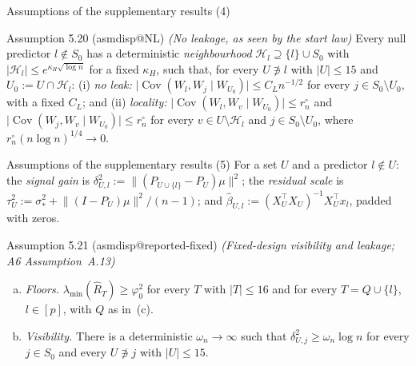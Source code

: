 \documentclass[aspectratio=169]{beamer}
\makeatletter
\newcommand{\asmdisp}[1]{\csname asmdisp@#1\endcsname}
\newcommand{\set}[1]{[#1]}
\newcommand{\abs}[1]{\lvert #1\rvert}
\newcommand{\norm}[1]{\lVert #1\rVert}
\DeclareMathOperator{\Cov}{Cov}
\newcommand{\lmin}{\lambda_{\min}}
\newcommand{\sigs}{\sigma_*}
\newcommand{\Sz}{S_0}
\newcommand{\Rhat}{\hat R}
\newcommand{\Hl}{\mathcal H}
\makeatother
\begin{document}
\begin{frame}{Assumptions of the supplementary results (4)}
\small
\begin{block}{Assumption 5.20 (\asmdisp{NL}) \textit{(No leakage, as seen by the start law)}}
Every null predictor $l\notin\Sz$ has a deterministic \emph{neighbourhood} $\Hl_l\supseteq\{l\}\cup\Sz$ with
$\abs{\Hl_l}\le e^{\kappa_H\sqrt{\log n}}$ for a fixed $\kappa_H$, such that, for every $U\not\ni l$ with $\abs{U}\le15$ and
$U_0:=U\cap\Hl_l$: (i) \emph{no leak:} $\abs{\Cov(W_l,W_j\mid W_{U_0})}\le C_Ln^{-1/2}$ for every $j\in\Sz\setminus U_0$,
with a fixed $C_L$; and (ii) \emph{locality:} $\abs{\Cov(W_l,W_v\mid W_{U_0})}\le r^\circ_n$ and
$\abs{\Cov(W_j,W_v\mid W_{U_0})}\le r^\circ_n$ for every $v\in U\setminus\Hl_l$ and $j\in\Sz\setminus U_0$, where
$r^\circ_n(n\log n)^{1/4}\to0$.
\end{block}
\end{frame}

\begin{frame}{Assumptions of the supplementary results (5)}
\small
\noindent For a set $U$ and a predictor $l\notin U$: the \emph{signal gain} is $\delta^2_{U,l}:=\norm{(P_{U\cup\{l\}}-P_U)\mu}^2$;
the \emph{residual scale} is $\tau^2_U:=\sigs^2+\norm{(I-P_U)\mu}^2/(n-1)$; and $\hat\beta_{U,l}:=(X_U^\top X_U)^{-1}X_U^\top
x_l$, padded with zeros.

\begin{block}{Assumption 5.21 (\asmdisp{reported-fixed}) \textit{(Fixed-design visibility and leakage; A6 Assumption~A.13)}}
\begin{enumerate}[(a)]
  \item \emph{Floors.} $\lmin(\Rhat_T)\ge\varphi_0^2$ for every $T$ with $\abs{T}\le16$ and for every
    $T=Q\cup\{l\}$, $l\in\set{p}$, with $Q$ as in~(c).
  \item \emph{Visibility.} There is a deterministic $\omega_n\to\infty$ such that
    $\delta^2_{U,j}\ge\omega_n\log n$ for every $j\in\Sz$ and every $U\not\ni j$ with $\abs{U}\le15$.
\end{enumerate}
\end{block}
\end{frame}
\end{document}
